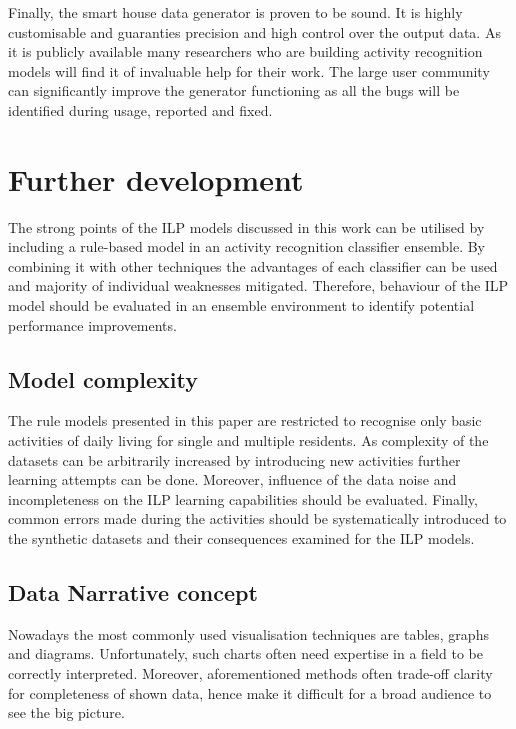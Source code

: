 \documentclass[10pt, a4paper, pdflatex, leqno, twoside, openright]{report}
\begin{document}
Finally, the smart house data generator is proven to be sound. It is highly customisable and guaranties precision and high control over the output data. As it is publicly available many researchers who are building activity recognition models will find it of invaluable help for their work. The large user community can significantly improve the generator functioning as all the bugs will be identified during usage, reported and fixed.

  \section{Further development}
The strong points of the ILP models discussed in this work can be utilised by including a rule-based model in an activity recognition classifier ensemble. By combining it with other techniques the advantages of each classifier can be used and majority of individual weaknesses mitigated. Therefore, behaviour of the ILP model should be evaluated in an ensemble environment to identify potential performance improvements.

    \subsection{Model complexity}
The rule models presented in this paper are restricted to recognise only basic activities of daily living for single and multiple residents. As complexity of the datasets can be arbitrarily increased by introducing new activities further learning attempts can be done. Moreover, influence of the data noise and incompleteness on the ILP learning capabilities should be evaluated. Finally, common errors made during the activities should be systematically introduced to the synthetic datasets and their consequences examined for the ILP models.

    \subsection{Data Narrative concept\label{sec:narrative}}
Nowadays the most commonly used visualisation techniques are tables, graphs and diagrams. Unfortunately, such charts often need expertise in a field to be correctly interpreted. Moreover, aforementioned methods often trade-off clarity for completeness of shown data, hence make it difficult for a broad audience to see the big picture.\\
\end{document}
